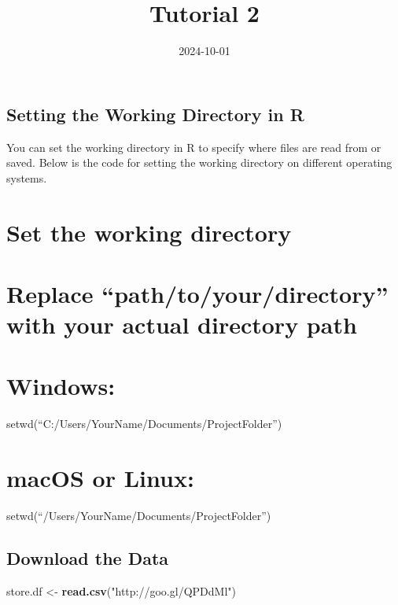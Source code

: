 \documentclass[
]{article}
\title{Tutorial 2}
\author{}
\date{\vspace{-2.5em}2024-10-01}
\newenvironment{Shaded}{\begin{snugshade}}{\end{snugshade}}
\newcommand{\FunctionTok}[1]{\textcolor[rgb]{0.13,0.29,0.53}{\textbf{#1}}}
\newcommand{\NormalTok}[1]{#1}
\newcommand{\OtherTok}[1]{\textcolor[rgb]{0.56,0.35,0.01}{#1}}
\newcommand{\StringTok}[1]{\textcolor[rgb]{0.31,0.60,0.02}{#1}}
\begin{document}
\maketitle

\subsection{Setting the Working Directory in
R}\label{setting-the-working-directory-in-r}

You can set the working directory in R to specify where files are read
from or saved. Below is the code for setting the working directory on
different operating systems.

\section{Set the working directory}\label{set-the-working-directory}

\section{Replace ``path/to/your/directory'' with your actual directory
path}\label{replace-pathtoyourdirectory-with-your-actual-directory-path}

\section{Windows:}\label{windows}

setwd(``C:/Users/YourName/Documents/ProjectFolder'')

\section{macOS or Linux:}\label{macos-or-linux}

setwd(``/Users/YourName/Documents/ProjectFolder'')

\subsection{Download the Data}\label{download-the-data}

\begin{Shaded}
\begin{Highlighting}[]
\NormalTok{store.df }\OtherTok{\textless{}{-}} \FunctionTok{read.csv}\NormalTok{(}\StringTok{"http://goo.gl/QPDdMl"}\NormalTok{)}
\end{Highlighting}
\end{Shaded}
\end{document}
